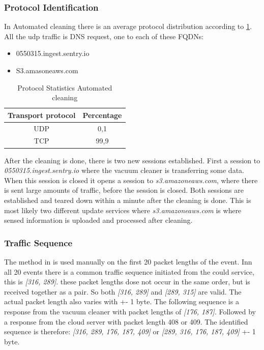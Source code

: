 \subsubsection{Protocol Identification}
In Automated cleaning there is an average protocol distribution according to \ref{tab:acanalysisdist}. All the udp traffic is DNS request, one to each of these FQDNs:

\begin{itemize}
    \item 0550315.ingest.sentry.io
    \item S3.amasoneaws.com
\end{itemize}

\begin{table}[H]
\centering
\caption{Protocol Statistics Automated cleaning}
\label{tab:acanalysisdist}
\begin{tabular}{|c|c|}
\hline
\textbf{Transport protocol} & \textbf{Percentage} \\ \hline
UDP                         & 0,1                 \\ \hline
TCP                         & 99,9                \\ \hline
\end{tabular}
\end{table}

After the cleaning is done, there is two new sessions established. First a session to \textit{0550315.ingest.sentry.io} where the vacuum cleaner is transferring some data. When this session is closed it opens a session to \textit{s3.amazoneaws.com}, where there is sent large amounts of traffic, before the session is closed. Both sessions are established and teared down within a minute after the cleaning is done. This is most likely two different update services where \textit{s3.amazoneaws.com} is where sensed information is uploaded and processed after cleaning.

\subsubsection{Traffic Sequence}
The method in \cite{pingpong} is used manually on the first 20 packet lengths of the event. Inn all 20 events there is a common traffic sequence initiated from the could service, this is \textit{[316, 289]}. these packet lengths dose not occur in the same order, but is received together as a pair. So both \textit{[316, 289]} and \textit{[289, 315]} are valid. The actual packet length also varies with +- 1 byte. 
The following sequence is a response from the vacuum cleaner with packet lengths of \textit{[176, 187]}. Followed by a response from the cloud server with packet length 408 or 409. The identified sequence is therefore: \textit{[316, 289, 176, 187, 409]} or \textit{[289, 316, 176, 187, 409]} +- 1 byte.

